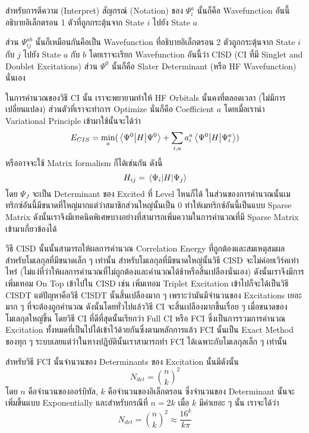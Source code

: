 สำหรับการตีความ (Interpret) สัญกรณ์ (Notation) ของ $\Psi^{a}_{i}$ นั้นก็คือ Wavefunction อันนี้อธิบายอิเล็กตรอน 1 ตัวที่ถูกกระตุ้นจาก State $i$ ไปยัง State $a$

ส่วน $\Psi^{ab}_{ij}$ นั้นก็เหมือนกันคือเป็น Wavefunction ที่อธิบายอิเล็กตรอน 2 ตัวถูกกระตุ้นจาก State $i$ กับ $j$ ไปยัง State $a$ กับ $b$ โดยเราจะเรียก Wavefunction อันนี้ว่า CISD (CI ที่มี Singlet and Doublet Excitations) ส่วน $\Psi^{0}$ นั้นก็คือ Slater Determinant (หรือ HF Wavefunction) นั่นเอง

ในการคำนวณของวิธี CI นั้น เราจะพยายามทำให้ HF Orbitals นั้นคงที่ตลอดเวลา (ไม่มีการเปลี่ยนแปลง) ส่วนตัวที่เราจะทำการ Optimize นั่นก็คือ Coefficient $a$ โดยเมื่อเรานำ Variational Principle เข้ามาใช้นั้นจะได้ว่า
%
\begin{equation}
    E_{CIS} = \min_{a} ( \mel{\Psi^{0}}{H}{\Psi^{0}}
    + \sum_{i,a} a^{a}_{i} \mel{\Psi^{0}}{H}{\Psi^{a}_{i}} )
\end{equation}
%
\noindent หรืออาจจะใช้ Matrix formalism ก็ได้เช่นกัน ดังนี้
%
\begin{equation}
    H_{ij} = \mel{\Psi_{i}}{H}{\Psi_{j}}
\end{equation}
%
โดย $\Psi_{J}$ จะเป็น Determinant ของ Excited ที่ Level ไหนก็ได้ ในส่วนของการคำนวณนั้นเมทริกซ์อันนี้มีขนาดที่ใหญ่มากแต่ว่าสมาชิกส่วนใหญ่นั้นเป็น 0 ทำให้เมทริกซ์อันนี้เป็นแบบ Sparse Matrix ดังนั้นเราจึงมีเทคนิคพิเศษบางอย่างที่สามารถเพิ่มความในการคำนวณที่มี Sparse Matrix เข้ามาเกี่ยวข้องได้

วิธี CISD นั้นนั้นสามารถให้ผลการคำนวณ Correlation Energy ที่ถูกต้องและสมเหตุสมผลสำหรับโมเลกุลที่มีขนาดเล็ก ๆ เท่านั้น สำหรับโมเลกุลที่มีขนาดใหญ่นั้นวิธี CISD จะไม่ค่อยเวิร์คเท่าไหร่ (ไม่แง่ที่ว่าให้ผลการคำนวณที่ไม่ถูกต้องและคำนวณได้ช้าหรือสิ้นเปลืองนั่นเอง) ดังนั้นเราจึงมีการเพิ่มเทอม On Top เข้าไปใน CISD เช่น เพิ่มเทอม Triplet Excitation เข้าไปก็จะได้เป็นวิธี CISDT แต่ปัญหาคือวิธี CISDT นั้นสิ้นเปลืองมาก ๆ เพราะว่ามันมีจำนวนของ Excitations เยอะมาก ๆ ที่จะต้องถูกคำนวณ ดังนั้นโดยทั่วไปแล้ววิธี CI จะสิ้นเปลืองมากขึ้นเรื่อย ๆ เมื่อขนาดของโมเลกุลใหญ่ขึ้น โดยวิธี CI ที่ดีที่สุดนั้นเรียกว่า Full CI หรือ FCI ซึ่งเป็นการรวมการคำนวณ
Excitation ทั้งหมดที่เป็นไปได้เข้าไว้ด้วยกันซึ่งตามหลักการแล้ว FCI นั้นเป็น Exact Method ของทุก ๆ ระบบเลยแต่ว่าในทางปฏิบัตินั้นเราสามารถทำ FCI ได้เฉพาะกับโมเลกุลเล็ก ๆ เท่านั้น

สำหรับวิธี FCI นั้นจำนวนของ Determinants ของ Excitation นั้นมีดังนั้น
%
\begin{equation}
    N_{det} = \binom{n}{k}^{2}
\end{equation}
%
\noindent โดย $n$ คือจำนวนของออร์บิทัล, $k$ คือจำนวนของอิเล็กตรอน ซึ่งจำนวนของ Determinant
นั้นจะเพิ่มขึ้นแบบ Exponentially และสำหรับกรณีที่ $n = 2k$ เมื่อ $k$ มีค่าเยอะ ๆ นั้น เราจะได้ว่า
%
\begin{equation}
    N_{det} = \binom{n}{k}^{2} \approx \frac{16^k}{k\pi}
\end{equation}


